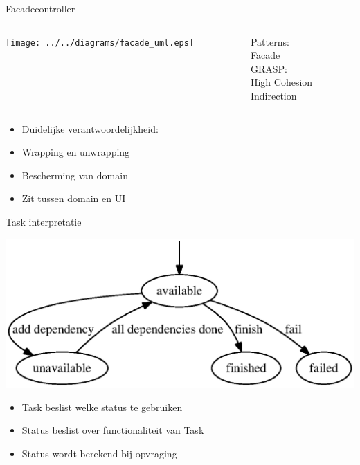 \documentclass[mathserif,serif]{beamer}
\begin{document}
  \begin{frame}{Facadecontroller}
      \begin{columns}[c]
        \begin{column}{0.80\textwidth}
      \texttt{[image: ../../diagrams/facade\_uml.eps]}
        \end{column}
        \begin{column}{0.20\textwidth}
          \begin{center}
            Patterns:\\
            Facade\\
            \vspace{1cm}
            GRASP:\\
            High Cohesion\\
            Indirection
          \end{center}
        \end{column}
      \end{columns}
      \begin{center}
        \begin{itemize}
        \item Duidelijke verantwoordelijkheid:
        \item Wrapping en unwrapping
        \item Bescherming van domain
        \item Zit tussen domain en UI
        \end{itemize}
      \end{center}
  \end{frame}

  \begin{frame}{Task interpretatie}
      \begin{center}
      \includegraphics[width=\textwidth,height=0.5\textheight,keepaspectratio]{../../diagrams/task_dfs.eps}
        \begin{itemize}
        \item Task beslist welke status te gebruiken
        \item Status beslist over functionaliteit van Task
        \item Status wordt berekend bij opvraging
        \end{itemize}
      \end{center}
  \end{frame}
\end{document}
